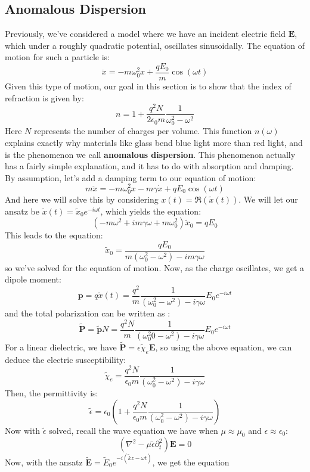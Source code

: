 \subsection{Anomalous Dispersion}
Previously, we've considered a model where we have an incident electric field \( \mathbf{E} \), which under a
roughly quadratic potential, oscillates sinusoidally. The equation of motion for such a particle is:
\[
	\ddot x = -m \omega_0^2 x + \frac{q E_0}{m}\cos(\omega t)
\]
Given this type of motion, our goal in this section is to show that the index of refraction is given by:
\[
	n = 1 + \frac{q^2 N}{2 \epsilon_0 m} \frac{1}{\omega_0^2 - \omega^2}
\]
Here \( N \) represents the number of charges per volume. This function \( n(\omega) \) explains exactly why
materials like glass bend blue light more than red light, and is the phenomenon we call \textbf{anomalous
dispersion}. This phenomenon actually has a fairly simple explanation, and it has to do with absorption and
damping. By assumption, let's add a damping term to our equation of motion:
\[
m \ddot x = - m \omega_0^2 x - m \gamma \dot x + q E_0 \cos(\omega t)
\]
And here we will solve this by considering \( x(t) = \Re(\tilde x(t)) \). We will let our ansatz be \( \tilde
x(t) = \tilde x_0 e^{-i \omega t}\), which yields the equation:
\[
	(- m \omega^2 + i m \gamma \omega + m \omega_0^2) \tilde x_0 = q E_0
\]
This leads to the equation:
\[
	\tilde x_0 = \frac{q E_0}{m(\omega_0^2 - \omega^2) - i m \gamma \omega}
\]
so we've solved for the equation of motion. Now, as the charge oscillates, we get a dipole moment:
\[
	\mathbf{p} = q \tilde x(t) = \frac{q^2}{m} \frac{1}{(\omega_0^2 - \omega^2) - i \gamma \omega} E_0 e^{-i
	\omega t}
\]
and the total polarization can be written as :
\[
	\tilde{\mathbf{P}} = \tilde{\mathbf{p}} N = \frac{q^2N}{m}\frac{1}{(\omega_0^2 0 - \omega^2) - i \gamma
	\omega} E_0 e^{-i \omega t}
\]
For a linear dielectric, we have \( \tilde{\mathbf{P}} = \epsilon \tilde \chi_e \mathbf{E} \), so using the
above equation, we can deduce the electric susceptibility:
\[
	\tilde \chi_e = \frac{q^2 N}{\epsilon_0 m}\frac{1}{(\omega_0^2 - \omega^2) - i \gamma \omega}
\]
Then, the permittivity is:
\[
	\tilde \epsilon = \epsilon_0\left( 1 + \frac{q^2 N}{\epsilon_0 m} \frac{1}{(\omega_0^2 - \omega^2) - i
	\gamma \omega} \right)
\]
Now with \( \tilde \epsilon \) solved, recall the wave equation we have when \( \mu \approx \mu_0 \) and \(
\epsilon \approx \epsilon_0 \):
\[
	(\nabla^2 - \mu \tilde \epsilon \partial_t^2) \mathbf{E} = 0
\]
Now, with the ansatz \( \tilde{\mathbf{E}} = \tilde E_0 e^{-i(\tilde k z - \omega t)} \), we get the equation
